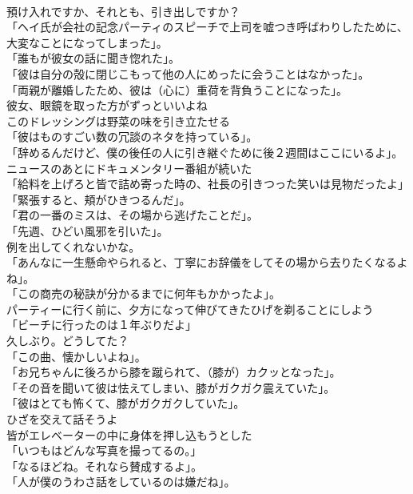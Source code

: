 \documentclass[8pt]{extreport}
\begin{document}
\begin{CJK}{UTF8}{min}
\\	預け入れですか、それとも、引き出しですか？	
\\	「ヘイ氏が会社の記念パーティのスピーチで上司を嘘つき呼ばわりしたために、大変なことになってしまった」。	
\\	「誰もが彼女の話に聞き惚れた」。	
\\	「彼は自分の殻に閉じこもって他の人にめったに会うことはなかった」。	
\\	「両親が離婚したため、彼は（心に）重荷を背負うことになった」。	
\\	彼女、眼鏡を取った方がずっといいよね	
\\	このドレッシングは野菜の味を引き立たせる	
\\	「彼はものすごい数の冗談のネタを持っている」。	
\\	「辞めるんだけど、僕の後任の人に引き継ぐために後２週間はここにいるよ」。	
\\	ニュースのあとにドキュメンタリー番組が続いた	
\\	「給料を上げろと皆で詰め寄った時の、社長の引きつった笑いは見物だったよ」	
\\	「緊張すると、頬がひきつるんだ」。	
\\	「君の一番のミスは、その場から逃げたことだ」。	
\\	「先週、ひどい風邪を引いた」。	
\\	例を出してくれないかな。	
\\	「あんなに一生懸命やられると、丁寧にお辞儀をしてその場から去りたくなるよね」。	
\\	「この商売の秘訣が分かるまでに何年もかかったよ」。	
\\	パーティーに行く前に、夕方になって伸びてきたひげを剃ることにしよう	
\\	「ビーチに行ったのは１年ぶりだよ」	
\\	久しぶり。どうしてた？	
\\	「この曲、懐かしいよね」。	
\\	「お兄ちゃんに後ろから膝を蹴られて、（膝が）カクッとなった」。	
\\	「その音を聞いて彼は怯えてしまい、膝がガクガク震えていた」。	
\\	「彼はとても怖くて、膝がガクガクしていた」。	
\\	ひざを交えて話そうよ	
\\	皆がエレベーターの中に身体を押し込もうとした	
\\	「いつもはどんな写真を撮ってるの。」	
\\	「なるほどね。それなら賛成するよ」。	
\\	「人が僕のうわさ話をしているのは嫌だね」。	

\end{CJK}
\end{document}
